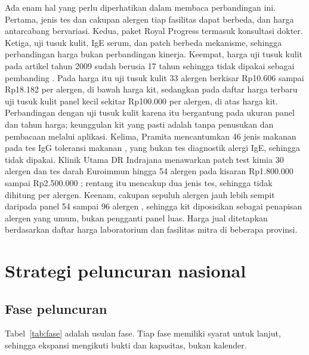 \documentclass[11pt,a4paper]{article}
\begin{document}
Ada enam hal yang perlu diperhatikan dalam membaca perbandingan ini. Pertama, jenis tes dan cakupan alergen tiap fasilitas dapat berbeda, dan harga antarcabang bervariasi. Kedua, paket Royal Progress termasuk konsultasi dokter. Ketiga, uji tusuk kulit, IgE serum, dan patch berbeda mekanisme, sehingga perbandingan harga bukan perbandingan kinerja. Keempat, harga uji tusuk kulit pada artikel tahun 2009 sudah berusia 17 tahun sehingga tidak dipakai sebagai pembanding \cite{medicastore}. Pada harga itu uji tusuk kulit 33 alergen berkisar Rp10.606 sampai Rp18.182 per alergen, di bawah harga kit, sedangkan pada daftar harga terbaru uji tusuk kulit panel kecil sekitar Rp100.000 per alergen, di atas harga kit. Perbandingan dengan uji tusuk kulit karena itu bergantung pada ukuran panel dan tahun harga; keunggulan kit yang pasti adalah tanpa penusukan dan pembacaan melalui aplikasi. Kelima, Pramita mencantumkan 46 jenis makanan pada tes IgG toleransi makanan \cite{pramita2}, yang bukan tes diagnostik alergi IgE, sehingga tidak dipakai. Klinik Utama DR Indrajana menawarkan patch test kimia 30 alergen dan tes darah Euroimmun hingga 54 alergen pada kisaran Rp1.800.000 sampai Rp2.500.000 \cite{tim}; rentang itu mencakup dua jenis tes, sehingga tidak dihitung per alergen. Keenam, cakupan sepuluh alergen jauh lebih sempit daripada panel 54 sampai 96 alergen \cite{royal,pramita}, sehingga kit diposisikan sebagai penapisan alergen yang umum, bukan pengganti panel luas. Harga jual ditetapkan berdasarkan daftar harga laboratorium dan fasilitas mitra di beberapa provinsi.

\section{Strategi peluncuran nasional}

\subsection{Fase peluncuran}

Tabel~\ref{tab:fase} adalah usulan fase. Tiap fase memiliki syarat untuk lanjut, sehingga ekspansi mengikuti bukti dan kapasitas, bukan kalender.
\end{document}
